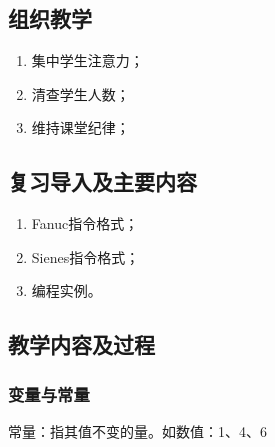 \jxhj{%
	}

\makeshouye %

\subsection{组织教学}
\begin{enumerate}[\hspace{2em}1、]
	\item 集中学生注意力；
	\item 清查学生人数；
	\item 维持课堂纪律；
\end{enumerate}

\subsection{复习导入及主要内容}
\begin{enumerate}[1、]
\item Fanuc指令格式；
\item Sienes指令格式；
\item 编程实例。
\end{enumerate}

\subsection{教学内容及过程}
	
\subsubsection{变量与常量}

	常量：指其值不变的量。如数值：1、4、6
	
